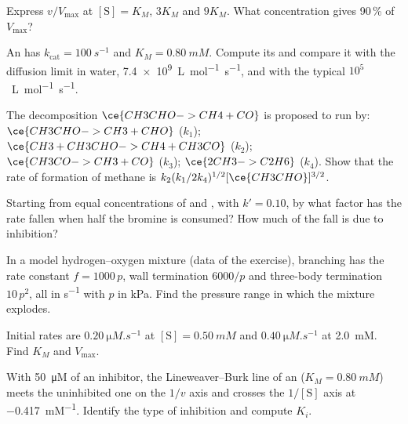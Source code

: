 \begin{exercise}[$\star$]\label{exo:b3:complex-kinetics:3}
Express $v/V_{\max}$ at $[\mathrm S] = K_M$, $3K_M$ and $9K_M$. What concentration gives 90\,\% of
$V_{\max}$?
\end{exercise}

\begin{exercise}[$\star$]\label{exo:b3:complex-kinetics:4}
An  has $k_{\mathrm{cat}} = \qty{100}{s^{-1}}$ and $K_M = \qty{0.80}{mM}$. Compute its  and compare it with the diffusion limit in water, \qty{7.4e9}{L.mol^{-1}.s^{-1}},
and with the typical $10^5$~\unit{L.mol^{-1}.s^{-1}}.
\end{exercise}

\begin{exercise}[$\star\star$]\label{exo:b3:complex-kinetics:5}
The decomposition $\ce{CH3CHO -> CH4 + CO}$ is proposed to run by: $\ce{CH3CHO -> CH3 +
CHO}$ ($k_1$); $\ce{CH3 + CH3CHO -> CH4 + CH3CO}$ ($k_2$); $\ce{CH3CO -> CH3 + CO}$ ($k_3$);
$\ce{2 CH3 -> C2H6}$ ($k_4$). Show that the rate of formation of methane is
$k_2(k_1/2k_4)^{1/2}[\ce{CH3CHO}]^{3/2}$.
\end{exercise}

\begin{exercise}[$\star\star$]\label{exo:b3:complex-kinetics:6}
Starting from equal concentrations of  and , with $k' = 0.10$, by what
factor has the rate fallen when half the bromine is consumed? How much of the
fall is due to inhibition?
\end{exercise}

\begin{exercise}[$\star\star$]\label{exo:b3:complex-kinetics:7}
In a model hydrogen--oxygen mixture (data of the exercise), branching has the
rate constant $f = 1000\,p$, wall termination $6000/p$ and three-body termination
$10\,p^2$, all in \unit{s^{-1}} with $p$ in kPa. Find the pressure range in which the mixture
explodes.
\end{exercise}

\begin{exercise}[$\star\star$]\label{exo:b3:complex-kinetics:8}
Initial rates are $\qty{0.20}{\micro M.s^{-1}}$ at $[\mathrm S] = \qty{0.50}{mM}$ and $\qty{0.40}{\micro M.s^{-1}}$ at
\qty{2.0}{mM}. Find $K_M$ and $V_{\max}$.
\end{exercise}

\begin{exercise}[$\star\star$]\label{exo:b3:complex-kinetics:9}
With \qty{50}{\micro M} of an inhibitor, the Lineweaver--Burk line of an 
($K_M = \qty{0.80}{mM}$) meets the uninhibited one on the $1/v$ axis and crosses the
$1/[\mathrm S]$ axis at \qty{-0.417}{mM^{-1}}. Identify the type of inhibition and compute $K_i$.
\end{exercise}

